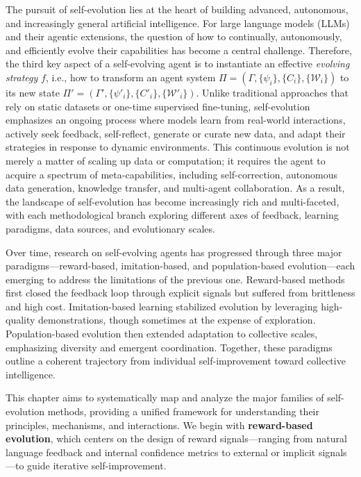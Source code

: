 \documentclass[10pt]{article} %
\begin{document}
The pursuit of self-evolution lies at the heart of building advanced, autonomous, and increasingly general artificial intelligence. For large language models (LLMs) and their agentic extensions, the question of how to continually, autonomously, and efficiently evolve their capabilities has become a central challenge. Therefore, the third key aspect of a self-evolving agent is to instantiate an effective \textit{evolving strategy} $f$, i.e., how to transform an agent system $\Pi=(\Gamma,\{\psi_i\}, \{C_i\}, \{\mathcal{W}_i\})$ to its new state $\Pi'=(\Gamma',\{\psi'_i\}, \{C'_i\}, \{\mathcal{W}'_i\})$. Unlike traditional approaches that rely on static datasets or one-time supervised fine-tuning, self-evolution emphasizes an ongoing process where models learn from real-world interactions, actively seek feedback, self-reflect, generate or curate new data, and adapt their strategies in response to dynamic environments. This continuous evolution is not merely a matter of scaling up data or computation; it requires the agent to acquire a spectrum of meta-capabilities, including self-correction, autonomous data generation, knowledge transfer, and multi-agent collaboration. As a result, the landscape of self-evolution has become increasingly rich and multi-faceted, with each methodological branch exploring different axes of feedback, learning paradigms, data sources, and evolutionary scales.


Over time, research on self-evolving agents has progressed through three major paradigms—reward-based, imitation-based, and population-based evolution—each emerging to address the limitations of the previous one. 
Reward-based methods first closed the feedback loop through explicit signals but suffered from brittleness and high cost. 
Imitation-based learning stabilized evolution by leveraging high-quality demonstrations, though sometimes at the expense of exploration. 
Population-based evolution then extended adaptation to collective scales, emphasizing diversity and emergent coordination. 
Together, these paradigms outline a coherent trajectory from individual self-improvement toward collective intelligence.



This chapter aims to systematically map and analyze the major families of self-evolution methods, providing a unified framework for understanding their principles, mechanisms, and interactions. We begin with \textbf{reward-based evolution}, which centers on the design of reward signals—ranging from natural language feedback and internal confidence metrics to external or implicit signals—to guide iterative self-improvement. 
\end{document}
